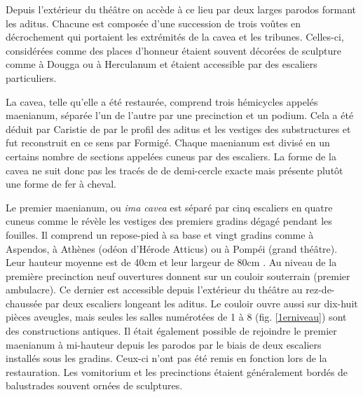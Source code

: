 Depuis l'extérieur du théâtre on accède à ce lieu par deux larges \gls{parodos} formant les \gls{aditus}. Chacune est composée d'une succession de trois voûtes en décrochement qui portaient les extrémités de la \gls{cavea} et les tribunes. Celles-ci, considérées comme des places d'honneur étaient souvent décorées de sculpture comme à Dougga ou à Herculanum et étaient accessible par des escaliers particuliers.
	
		La  \gls{cavea}, telle qu'elle a été restaurée, comprend trois hémicycles appelés \gls{maenianum}, séparée l'un de l'autre par une \gls{precinction} et un \gls{podium}. Cela a été déduit par Caristie de par le profil des \gls{aditus} et les vestiges des substructures et fut reconstruit en ce sens par Formigé. Chaque \gls{maenianum} est divisé en un certains nombre de sections appelées \gls{cuneus} par des escaliers. La forme de la \gls{cavea} ne suit donc pas les tracés de \cite{vitruve} de demi-cercle exacte mais présente plutôt une forme de fer à cheval.
		
		
Le premier \gls{maenianum}, ou \textit{ima cavea} est séparé par cinq escaliers en quatre \gls{cuneus} comme le révèle les vestiges des premiers gradins dégagé pendant les fouilles. Il comprend un repose-pied à sa base et vingt gradins comme à Aspendos, à Athènes (odéon d'Hérode Atticus) ou à Pompéi (grand théâtre). Leur hauteur moyenne est de 40cm et leur largeur de 80cm \cite{formige}. Au niveau de la première \gls{precinction} neuf ouvertures donnent  sur un couloir souterrain (premier \gls{ambulacre}). Ce dernier est accessible depuis l'extérieur du théâtre au rez-de-chaussée par deux escaliers longeant les \gls{aditus}. Le couloir ouvre aussi sur dix-huit pièces aveugles, mais seules les salles numérotées de 1 à 8 (fig. \ref{1erniveau}) sont des constructions antiques. Il était également possible de rejoindre le premier \gls{maenianum} à mi-hauteur depuis les \gls{parodos} par le biais de deux escaliers installés sous les gradins. Ceux-ci n'ont pas été remis en fonction lors de la restauration. Les \gls{vomitorium} et les \glspl{precinction} étaient généralement bordés de balustrades souvent ornées de sculptures.
		
